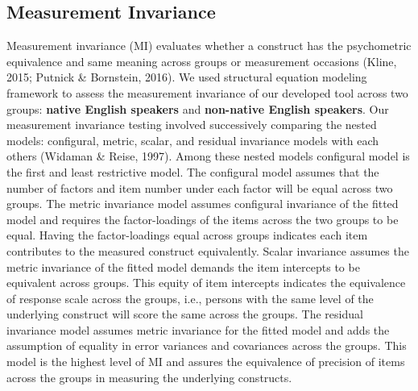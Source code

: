 \documentclass[
  english,
  man]{apa6}
\begin{document}
\hypertarget{measurement-invariance}{%
\subsection{Measurement Invariance}\label{measurement-invariance}}

Measurement invariance (MI) evaluates whether a construct has the psychometric equivalence and same meaning across groups or measurement occasions (Kline, 2015; Putnick \& Bornstein, 2016). We used structural equation modeling framework to assess the measurement invariance of our developed tool across two groups: \textbf{native English speakers} and \textbf{non-native English speakers}. Our measurement invariance testing involved successively comparing the nested models: configural, metric, scalar, and residual invariance models with each others (Widaman \& Reise, 1997). Among these nested models configural model is the first and least restrictive model. The configural model assumes that the number of factors and item number under each factor will be equal across two groups. The metric invariance model assumes configural invariance of the fitted model and requires the factor-loadings of the items across the two groups to be equal. Having the factor-loadings equal across groups indicates each item contributes to the measured construct equivalently. Scalar invariance assumes the metric invariance of the fitted model demands the item intercepts to be equivalent across groups. This equity of item intercepts indicates the equivalence of response scale across the groups, i.e., persons with the same level of the underlying construct will score the same across the groups. The residual invariance model assumes metric invariance for the fitted model and adds the assumption of equality in error variances and covariances across the groups. This model is the highest level of MI and assures the equivalence of precision of items across the groups in measuring the underlying constructs.
\end{document}
